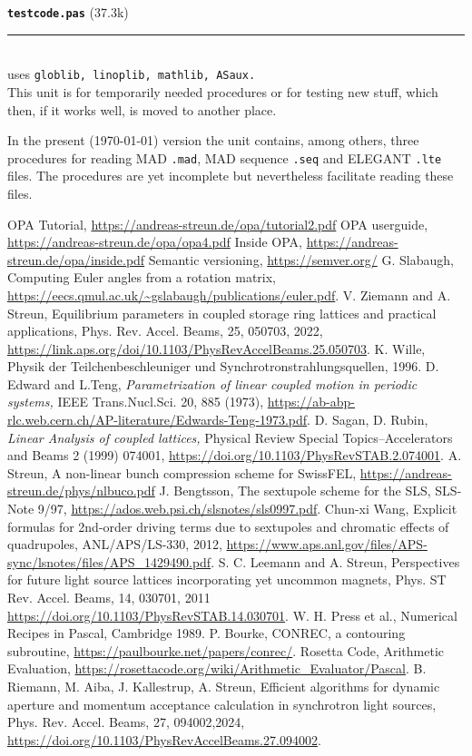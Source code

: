 \documentclass[12pt]{article}
\newcommand\opamodule[3]{{\bf \tt #1} #2\\  \rule[3pt]{\textwidth}{0.2pt} \\ {\scriptsize uses \tt  #3}\\[1ex]}
\begin{document}
\opamodule{testcode.pas}{(37.3k)}{globlib, linoplib, mathlib, ASaux.}
This unit is for temporarily needed procedures or for testing new stuff, which then, if it works well, is moved to another place.

In the present (\today) version the unit contains, among others, three procedures for reading MAD {\tt .mad}, MAD sequence {\tt .seq} and ELEGANT {\tt .lte} files. The procedures are yet incomplete but nevertheless facilitate reading these files.\\







\begin{thebibliography}{18}
OPA Tutorial, \url{https://andreas-streun.de/opa/tutorial2.pdf}
OPA userguide, \url{https://andreas-streun.de/opa/opa4.pdf} 
Inside OPA, \url{https://andreas-streun.de/opa/inside.pdf} 
Semantic versioning, \url{https://semver.org/}
G. Slabaugh, Computing Euler angles from a rotation matrix, \url{https://eecs.qmul.ac.uk/~gslabaugh/publications/euler.pdf}.
V. Ziemann and A. Streun, Equilibrium parameters in coupled storage ring lattices and practical applications, Phys. Rev. Accel. Beams, 25, 050703, 2022, \url{https://link.aps.org/doi/10.1103/PhysRevAccelBeams.25.050703}.
K. Wille, Physik der Teilchenbeschleuniger und Synchrotronstrahlungsquellen, 1996.
 D. Edward and L.Teng, {\em Parametrization of linear coupled motion in periodic
systems,} IEEE Trans.Nucl.Sci. 20, 885 (1973), \url{https://ab-abp-rlc.web.cern.ch/AP-literature/Edwards-Teng-1973.pdf}.
D. Sagan, D. Rubin, {\em Linear Analysis of coupled lattices,} Physical Review Special
Topics--Accelerators and Beams 2 (1999) 074001, \url{https://doi.org/10.1103/PhysRevSTAB.2.074001}.
A. Streun, A non-linear bunch compression scheme for SwissFEL, \url{https://andreas-streun.de/phys/nlbuco.pdf}
J. Bengtsson, The sextupole scheme for the SLS, SLS-Note 9/97,  \url{https://ados.web.psi.ch/slsnotes/sls0997.pdf}.
Chun-xi Wang, Explicit formulas for 2nd-order driving terms due to sextupoles and chromatic effects of quadrupoles, ANL/APS/LS-330, 2012, \url{https://www.aps.anl.gov/files/APS-sync/lsnotes/files/APS_1429490.pdf}.
S. C. Leemann and A. Streun, Perspectives for future light source lattices incorporating yet uncommon magnets, Phys. ST Rev. Accel. Beams, 14, 030701, 2011 \url{https://doi.org/10.1103/PhysRevSTAB.14.030701}.
W. H. Press et al., Numerical Recipes in Pascal, Cambridge 1989.
P. Bourke, CONREC, a contouring subroutine, \url{https://paulbourke.net/papers/conrec/}.
Rosetta Code, Arithmetic Evaluation, \url{https://rosettacode.org/wiki/Arithmetic\_Evaluator/Pascal}.
B. Riemann, M. Aiba, J. Kallestrup, A. Streun, Efficient algorithms for dynamic aperture and momentum acceptance calculation in synchrotron light sources, Phys. Rev. Accel. Beams, 27, 094002,2024, \url{https://doi.org/10.1103/PhysRevAccelBeams.27.094002}.
\end{thebibliography}
\end{document}
